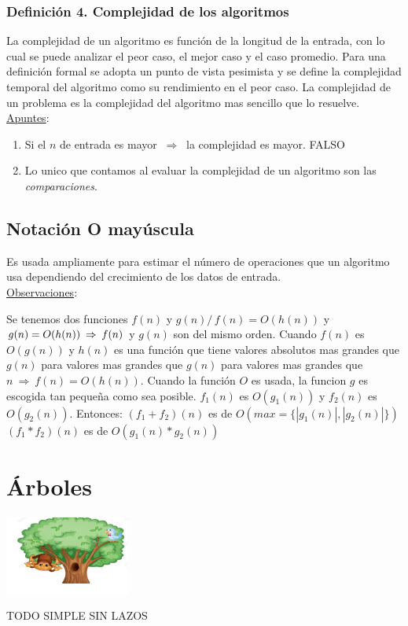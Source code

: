 \documentclass{article}
\newcommand{\tq}{/\,}                                   %
\newcommand{\Rightarrows}{\: \Rightarrow \:}            %
\begin{document}
\subsubsection*{Definición 4. Complejidad de los algoritmos}
La complejidad de un algoritmo es función de la longitud de la entrada, con lo cual se
puede analizar el peor caso, el mejor caso y el caso promedio. Para una definición formal
se adopta un punto de vista pesimista y se define la complejidad temporal del algoritmo
como su rendimiento en el peor caso. La complejidad de un problema es la complejidad
del algoritmo mas sencillo que lo resuelve.
\\\underline{Apuntes}:
\begin{enumerate}
    \item Si el $n$ de entrada es mayor $\Rightarrows$ la complejidad es mayor. FALSO
    \item Lo unico que contamos al evaluar la complejidad de un algoritmo son las \emph{comparaciones}.
\end{enumerate}
\subsection{Notación O mayúscula}
Es usada ampliamente para estimar el número de operaciones que un algoritmo usa
dependiendo del crecimiento de los datos de entrada.
\\\underline{Observaciones}:
\begin{outline}[enumerate]
    \1 Se tenemos dos funciones $f(n)$ y $g(n) \tq f(n) = O(h(n))$ y $g(n) = O(h(n)) \\\Rightarrows f(n)$ y $g(n)$ son del mismo orden.
    \1 Cuando $f(n)$ es $O(g(n))$ y $h(n)$ es una función que tiene valores absolutos mas grandes que $g(n)$ para valores mas grandes que $g(n)$
para valores mas grandes que $n \Rightarrows f(n) = O(h(n))$.
    \1 Cuando la función $O$ es usada, la funcion $g$ es escogida tan pequeña como sea posible.
    \1 $f_1(n)$ es $O(g_1(n))$ y $f_2(n)$ es $O(g_2(n))$. Entonces:
        \2 $(f_1 + f_2)(n)$ es de $O(max = \{ |g_1(n)|, |g_2(n)| \} )$
        \2 $(f_1 * f_2)(n)$ es de $O(g_1(n) * g_2(n))$
\end{outline}

\newpage
\section{Árboles}
\begin{center}
    \includegraphics[width=.30\textwidth]{monitoXD.PNG}
\end{center}
TODO SIMPLE SIN LAZOS
\end{document}
